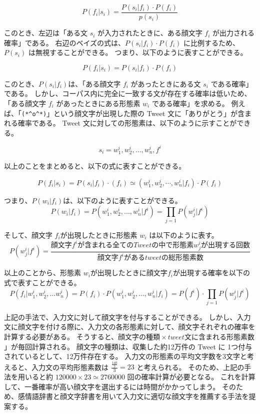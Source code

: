 \documentclass[11pt,a4j]{jsarticle}
\begin{document}
\[
  P(f_i|s_i)=\frac{P(s_i|f_i) \cdot P(f_i)}{p(s_i)}
\]

このとき、左辺は「ある文 $s_i$ が入力されたときに、ある顔文字 $f_i$ が出力される確率」である。
右辺のベイズの式は、$P(s_i|f_i) \cdot P(f_i)$ に比例するため、$P(s_i)$ は無視することができる。
つまり、以下のように表すことができる。

\[
  P(f_i|s_i)=P(s_i|f_i) \cdot P(f_i)
\]

このとき、$P(s_i|f_i)$は、「ある顔文字 $f_i$ があったときにある文 $s_i$ である確率」である。
しかし、コーパス内に完全に一致する文が存在する確率は低いため、「ある顔文字 $f_i$ があったときにある形態素 $w_i$ である確率」を求める。
例えば、「\verb|(*^o^*)|」という顔文字が出現した際の Tweet 文に「ありがとう」が含まれる確率である。
Tweet 文に対しての形態素は、以下のように示すことができる。

\[
s_i = w_1^i,w_2^i,\ldots,w_n^i,f^i
\]


以上のことをまとめると、以下の式に表すことができる。

\[
  P(f_i|s_i)=P(s_i|f_i) \cdot (f_i) \simeq (w^i_1,w^i_2, \cdots,w^i_n|f_i)\cdot P(f_i)
\]

つまり、$P(w_i|f_i)$は、以下のように表すことができる。
\[
P(w_i|f_i) = P(w^i_1,w^i_2,\ldots,w^i_n|f^i) = \prod_{j=1} P(w^i_j|f^i)
\]

そして、顔文字 $f_i$が出現したときに形態素 $w_i$ は以下のように表す。
\[
P(w^i_j|f^i) = \frac{顔文字 f^i が含まれる全てのTweetの中で形態素 w^i_j が出現する回数}{顔文字 f^i があるtweetの総形態素数}
\]

以上のことから、形態素 $w_i$が出現したときに顔文字$f_i$が出現する確率を以下の式で表すことができる。
\[
  P(f_i|w^i_1,w^i_2, \dots w^i_n) = P(f_i) \cdot P(w^i_1,w^i_2, \dots ,w^i_n|f_i) = P(f^i) \cdot \prod_{j=1} P(w^i_j|f^i)
\]

上記の手法で、入力文に対して顔文字を付与することができる。
しかし、入力文に顔文字を付ける際に、入力文の各形態素に対して、顔文字それぞれの確率を計算する必要がある。
そうすると、$顔文字の種類 \times \mathit{tweet}文に含まれる形態素数$」が毎回計算される。
顔文字の種類は、収集した約12万件の Tweet に 1つ付与されているとして、12万件存在する。
入力文の形態素の平均文字数を3文字と考えると、入力文の平均形態素数は $\frac{\frac{140}{2}}{3}=23$ と考えられる。
そのため、上記の手法を用いると約 $120000 \times 23 \simeq 2760000$ 回の確率計算が必要となる。
これを計算して、一番確率が高い顔文字を選出するには時間がかかってしまう。
そのため、感情語辞書と顔文字辞書を用いて入力文に適切な顔文字を推薦する手法を提案する。
\end{document}
